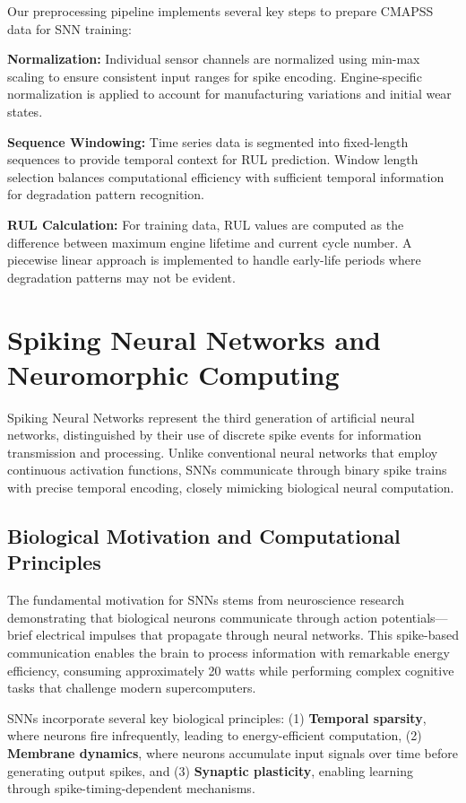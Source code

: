 \documentclass[11pt]{article}
\begin{document}
Our preprocessing pipeline implements several key steps to prepare CMAPSS data for SNN training:

\textbf{Normalization:} Individual sensor channels are normalized using min-max scaling to ensure consistent input ranges for spike encoding. Engine-specific normalization is applied to account for manufacturing variations and initial wear states.

\textbf{Sequence Windowing:} Time series data is segmented into fixed-length sequences to provide temporal context for RUL prediction. Window length selection balances computational efficiency with sufficient temporal information for degradation pattern recognition.

\textbf{RUL Calculation:} For training data, RUL values are computed as the difference between maximum engine lifetime and current cycle number. A piecewise linear approach is implemented to handle early-life periods where degradation patterns may not be evident.

\section{Spiking Neural Networks and Neuromorphic Computing}

Spiking Neural Networks represent the third generation of artificial neural networks, distinguished by their use of discrete spike events for information transmission and processing. Unlike conventional neural networks that employ continuous activation functions, SNNs communicate through binary spike trains with precise temporal encoding, closely mimicking biological neural computation.

\subsection{Biological Motivation and Computational Principles}

The fundamental motivation for SNNs stems from neuroscience research demonstrating that biological neurons communicate through action potentials—brief electrical impulses that propagate through neural networks. This spike-based communication enables the brain to process information with remarkable energy efficiency, consuming approximately 20 watts while performing complex cognitive tasks that challenge modern supercomputers.

SNNs incorporate several key biological principles: (1) \textbf{Temporal sparsity}, where neurons fire infrequently, leading to energy-efficient computation, (2) \textbf{Membrane dynamics}, where neurons accumulate input signals over time before generating output spikes, and (3) \textbf{Synaptic plasticity}, enabling learning through spike-timing-dependent mechanisms.
\end{document}
